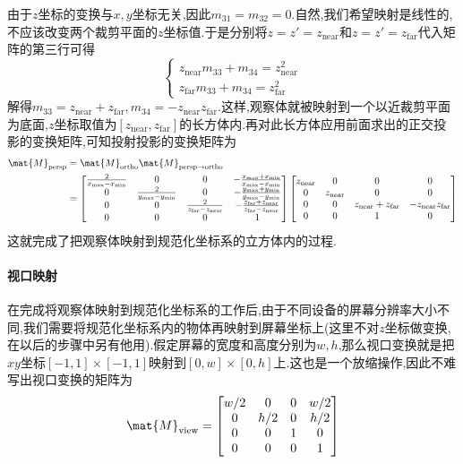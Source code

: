 \documentclass{ctexart}
\begin{document}
由于$z$坐标的变换与$x,y$坐标无关,因此$m_{31}=m_{32}=0$.自然,我们希望映射是线性的,不应该改变两个裁剪平面的$z$坐标值.于是分别将$z=z'=z_{\text{near}}$和$z=z'=z_{\text{far}}$代入矩阵的第三行可得
\[\left\{\begin{array}{l}
    z_{\text{near}}m_{33}+m_{34}=z_{\text{near}}^2\\
    z_{\text{far}}m_{33}+m_{34}=z_{\text{far}}^2
\end{array}\right.\]
解得$m_{33}=z_{\text{near}}+z_{\text{far}},m_{34}=-z_{\text{near}}z_{\text{far}}$.这样,观察体就被映射到一个以近裁剪平面为底面,$z$坐标取值为$\left[z_{\text{near}},z_{\text{far}}\right]$的长方体内.再对此长方体应用前面求出的正交投影的变换矩阵,可知投射投影的变换矩阵为
\[\begin{aligned}
    \mat{M}_{\text{persp}}
    &=\mat{M}_{\text{ortho}}\mat{M}_{\text{persp}\to\text{ortho}}\\
    &=\begin{bmatrix}
    \frac{2}{x_{\max}-x_{\min}}&0&0&-\frac{x_{\max}+x_{\min}}{x_{\max}-x_{\min}}\\
    0&\frac{2}{y_{\max}-y_{\min}}&0&-\frac{y_{\max}+y_{\min}}{y_{\max}-y_{\min}}\\
    0&0&\frac{2}{z_{\text{far}}-z_{\text{near}}}&-\frac{z_{\text{far}}+z_{\text{near}}}{z_{\text{far}}-z_{\text{near}}}\\
    0&0&0&1
    \end{bmatrix}\begin{bmatrix}
    z_{\text{near}}&0&0&0\\
    0&z_{\text{near}}&0&0\\
    0&0&z_{\text{near}}+z_{\text{far}}&-z_{\text{near}}z_{\text{far}}\\
    0&0&1&0
    \end{bmatrix}
\end{aligned}\]
这就完成了把观察体映射到规范化坐标系的立方体内的过程.
\paragraph{视口映射}
在完成将观察体映射到规范化坐标系的工作后,由于不同设备的屏幕分辨率大小不同,我们需要将规范化坐标系内的物体再映射到屏幕坐标上(这里不对$z$坐标做变换,在以后的步骤中另有他用).假定屏幕的宽度和高度分别为$w,h$,那么视口变换就是把$xy$坐标$[-1,1]\times[-1,1]$映射到$[0,w]\times[0,h]$上.这也是一个放缩操作,因此不难写出视口变换的矩阵为
\[\mat{M}_{\text{view}}=\begin{bmatrix}
    w/2&0&0&w/2\\
    0&h/2&0&h/2\\
    0&0&1&0\\
    0&0&0&1
\end{bmatrix}\]
\end{document}
